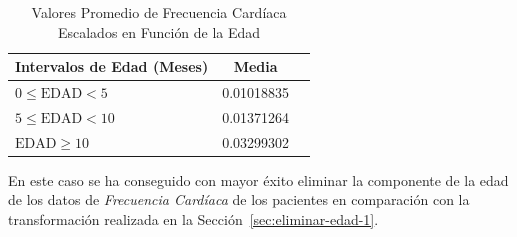 \begin{table}[H]
    \centering
    \begin{tabular}{lcc}
        \toprule
        \textbf{Intervalos de Edad (Meses)} & \textbf{Media} \\
        \midrule
        $0 \leq \text{EDAD} < 5$ & 0.01018835 \\
        $5 \leq \text{EDAD} < 10$ & 0.01371264 \\
        $\text{EDAD} \geq 10$ & 0.03299302 \\
        \bottomrule
    \end{tabular}
    \caption{Valores Promedio de Frecuencia Cardíaca Escalados en Función de la Edad}
    \label{tabla:frecuencia-cardiaca-escalada-edad}
\end{table}

En este caso se ha conseguido con mayor éxito eliminar la componente de la edad de los datos de \textit{Frecuencia Cardíaca} de los pacientes en comparación con la transformación realizada en la Sección~\ref{sec:eliminar-edad-1}.


